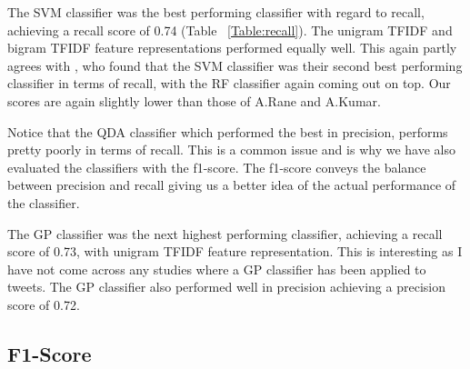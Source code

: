 The SVM classifier was the best performing classifier with regard to recall, achieving a recall score of 0.74 (Table ~\ref{Table:recall}). The unigram TFIDF and bigram TFIDF feature representations performed equally well. This again partly agrees with \cite{Rane2018}, who found that the SVM classifier was their second best performing classifier in terms of recall, with the RF classifier again coming out on top. Our scores are again slightly lower than those of A.Rane and A.Kumar.

Notice that the QDA classifier which performed the best in precision, performs pretty poorly in terms of recall. This is a common issue and is why we have also evaluated the classifiers with the f1-score. The f1-score conveys the balance between precision and recall giving us a better idea of the actual performance of the classifier.

The GP classifier was the next highest performing classifier, achieving a recall score of 0.73, with unigram TFIDF feature representation. This is interesting as I have not come across any studies where a GP classifier has been applied to tweets. The GP classifier also performed well in precision achieving a precision score of 0.72.  

\subsection{F1-Score}

